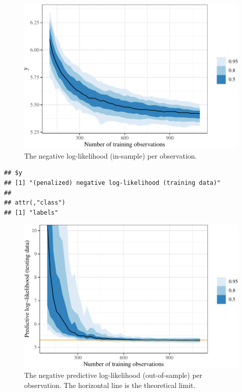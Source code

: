 \documentclass[11pt]{article}
\begin{document}
\begin{figure}[t]

{\centering \includegraphics{gfx/pen-negll-1} 

}

\caption{The negative log-likelihood (in-sample) per observation.}\label{fig:pen-negll}
\end{figure}

\begin{verbatim}
## $y
## [1] "(penalized) negative log-likelihood (training data)"
## 
## attr(,"class")
## [1] "labels"
\end{verbatim}

\begin{figure}[t]

{\centering \includegraphics{gfx/predict-negll-1} 

}

\caption{The negative predictive log-likelihood (out-of-sample) per observation. The horizontal line is the theoretical limit.}\label{fig:predict-negll}
\end{figure}
\end{document}
